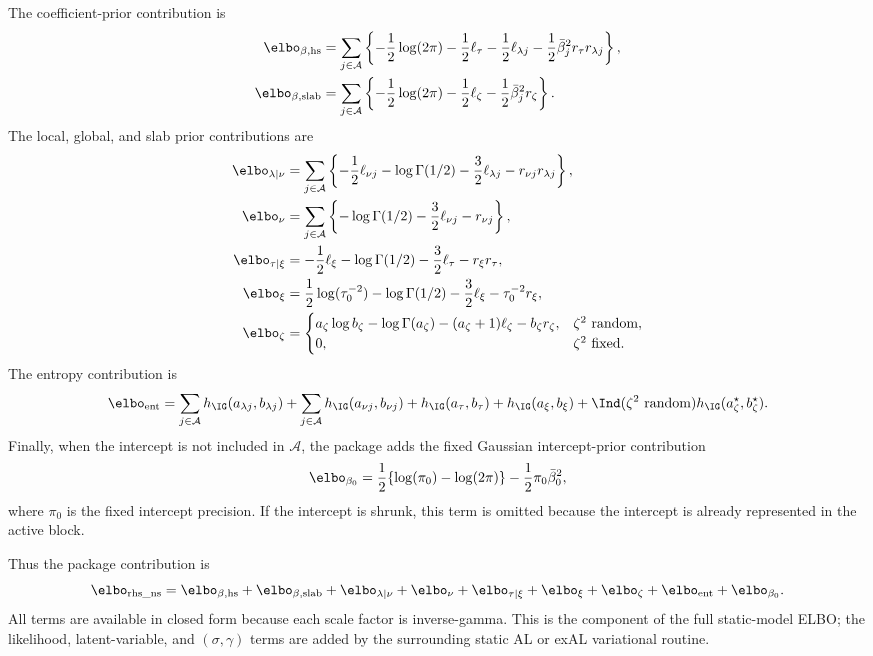 The coefficient-prior contribution is
\begin{align}
\elbo_{\beta,\mathrm{hs}}
&=
\sum_{j\in\mathcal{A}}
\left\{
-\frac12\log(2\pi)
-\frac12\ell_\tau
-\frac12\ell_{\lambda j}
-\frac12\bar\beta_j^2 r_\tau r_{\lambda j}
\right\},\\
\elbo_{\beta,\mathrm{slab}}
&=
\sum_{j\in\mathcal{A}}
\left\{
-\frac12\log(2\pi)
-\frac12\ell_\zeta
-\frac12\bar\beta_j^2 r_\zeta
\right\}.
\end{align}
The local, global, and slab prior contributions are
\begin{align}
\elbo_{\lambda\mid\nu}
&=
\sum_{j\in\mathcal{A}}
\left\{
-\frac12\ell_{\nu j}
-\log\Gamma(1/2)
-\frac32\ell_{\lambda j}
-r_{\nu j}r_{\lambda j}
\right\},\\
\elbo_{\nu}
&=
\sum_{j\in\mathcal{A}}
\left\{
-\log\Gamma(1/2)
-\frac32\ell_{\nu j}
-r_{\nu j}
\right\},\\
\elbo_{\tau\mid\xi}
&=
-\frac12\ell_\xi
-\log\Gamma(1/2)
-\frac32\ell_\tau
-r_\xi r_\tau,\\
\elbo_{\xi}
&=
\frac12\log(\tau_0^{-2})
-\log\Gamma(1/2)
-\frac32\ell_\xi
-\tau_0^{-2}r_\xi,\\
\elbo_{\zeta}
&=
\begin{cases}
a_\zeta\log b_\zeta-\log\Gamma(a_\zeta)
-(a_\zeta+1)\ell_\zeta-b_\zeta r_\zeta,
& \zeta^2\text{ random},\\
0, & \zeta^2\text{ fixed}.
\end{cases}
\end{align}
The entropy contribution is
\begin{equation}
\elbo_{\mathrm{ent}}
=
\sum_{j\in\mathcal{A}} h_{\IG}(a_{\lambda j},b_{\lambda j})
+\sum_{j\in\mathcal{A}} h_{\IG}(a_{\nu j},b_{\nu j})
+h_{\IG}(a_\tau,b_\tau)
+h_{\IG}(a_\xi,b_\xi)
+\Ind(\zeta^2\text{ random})h_{\IG}(a_\zeta^\star,b_\zeta^\star).
\end{equation}
Finally, when the intercept is not included in $\mathcal{A}$, the package adds
the fixed Gaussian intercept-prior contribution
\begin{equation}
\elbo_{\beta_0}
=
\frac12\{\log(\pi_0)-\log(2\pi)\}
-\frac12\pi_0\bar\beta_0^2,
\end{equation}
where $\pi_0$ is the fixed intercept precision. If the intercept is shrunk,
this term is omitted because the intercept is already represented in the
active  block.

Thus the package contribution is
\begin{equation}
\elbo_{\mathrm{rhs\_ns}}
=
\elbo_{\beta,\mathrm{hs}}
+\elbo_{\beta,\mathrm{slab}}
+\elbo_{\lambda\mid\nu}
+\elbo_{\nu}
+\elbo_{\tau\mid\xi}
+\elbo_{\xi}
+\elbo_{\zeta}
+\elbo_{\mathrm{ent}}
+\elbo_{\beta_0}.
\label{eq:rhs_ns_elbo}
\end{equation}
All terms are available in closed form because each scale factor is
inverse-gamma. This is the  component of the full static-model ELBO; the
likelihood, latent-variable, and $(\sigma,\gamma)$ terms are added by the
surrounding static AL or exAL variational routine.

